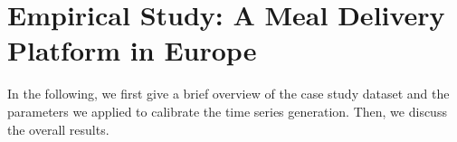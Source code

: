 \section{Empirical Study: A Meal Delivery Platform in Europe}
\label{stu}

In the following, we first give a brief overview of the case study dataset
    and the parameters we applied to calibrate the time series generation.
Then, we discuss the overall results.
